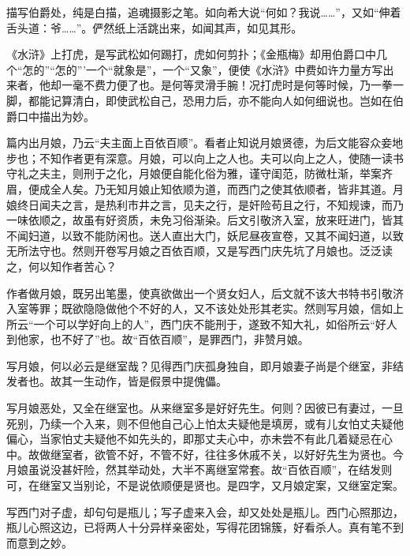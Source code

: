 {描写伯爵处，纯是白描，追魂摄影之笔。如向希大说“何如？我说……”，又如“伸着舌头道：爷……”。俨然纸上活跳出来，如闻其声，如见其形。

《水浒》上打虎，是写武松如何踢打，虎如何剪扑；《金瓶梅》却用伯爵口中几个“怎的”“怎的”’一个“就象是”，一个“又象”，便使《水浒》中费如许力量方写出来者，他却一毫不费力便了也。是何等灵滑手腕！况打虎时是何等时候，乃一拳一脚，都能记算清白，即使武松自己，恐用力后，亦不能向人如何细说也。岂如在伯爵口中描出为妙。

篇内出月娘，乃云“夫主面上百依百顺”。看者止知说月娘贤德，为后文能容众妾地步也；不知作者更有深意。月娘，可以向上之人也。夫可以向上之人，使随一读书守礼之夫主，则刑于之化，月娘便自能化俗为雅，谨守闺范，防微杜渐，举案齐眉，便成全人矣。乃无知月娘止知依顺为道，而西门之使其依顺者，皆非其道。月娘终日闻夫之言，是热利市井之言，见夫之行，是奸险苟且之行，不知规谏，而乃一味依顺之，故虽有好资质，未免习俗渐染。后文引敬济入室，放来旺进门，皆其不闻妇道，以致不能防闲也。送人直出大门，妖尼昼夜宣卷，又其不闻妇道，以致无所法守也。然则开卷写月娘之百依百顺，又是写西门庆先坑了月娘也。泛泛读之，何以知作者苦心？

作者做月娘，既另出笔墨，使真欲做出一个贤女妇人，后文就不该大书特书引敬济入室等罪；既欲隐隐做他个不好的人，又不该处处形其老实。然则写月娘，信如上所云“一个可以学好向上的人”，西门庆不能刑于，遂致不知大礼，如俗所云“好人到他家，也不好了”也。故“百依百顺”，是罪西门，非赞月娘。

写月娘，何以必云是继室哉？见得西门庆孤身独自，即月娘妻子尚是个继室，非结发者也。故其一生动作，皆是假景中提傀儡。

写月娘恶处，又全在继室也。从来继室多是好好先生。何则？因彼已有妻过，一旦死别，乃续一个入来，则不但他自己心上怕太夫疑他是填房，或有儿女怕丈夫疑他偏心，当家怕丈夫疑他不如先头的，即那丈夫心中，亦未尝不有此几着疑忌在心中。故做继室者，欲管不好，不管不好，往往多休戚不关，以好好先生为贤也。今月娘虽说没甚奸险，然其举动处，大半不离继室常套。故“百依百顺”，在结发则可，在继室又当别论，不是说依顺便是贤也。是四字，又月娘定案，又继室定案。

写西门对子虚，却句句是瓶儿；写子虚来入会，却又处处是瓶儿。西门心照那边，瓶儿心照这边，已将两人十分异样亲密处，写得花团锦簇，好看杀人。真有笔不到而意到之妙。

}
